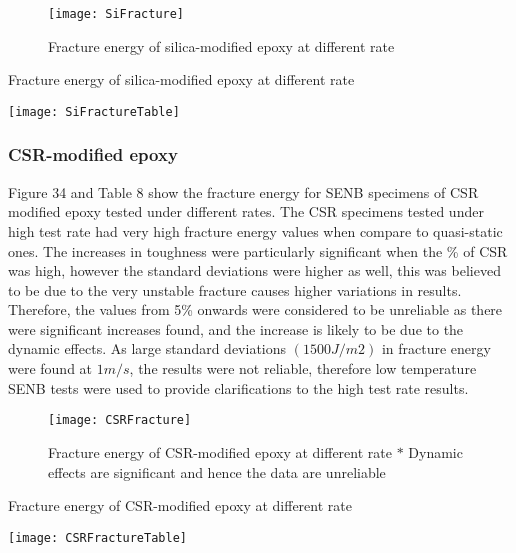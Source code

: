 \documentclass[numbers=noendperiod,chapterprefix=on]{icldt} %
\begin{document}
\begin{figure}[!htpb]
\centering
\texttt{[image: SiFracture]}
\caption{Fracture energy of silica-modified epoxy at different rate} %
\end{figure}
\FloatBarrier

\begin{table}[!htpb]
\centering
\caption{Fracture energy of silica-modified epoxy at different rate} %
\texttt{[image: SiFractureTable]}
\end{table}
\FloatBarrier


\subsubsection{CSR-modified epoxy}
Figure 34 and Table 8 show the fracture energy for SENB specimens of CSR modified epoxy tested under different rates. The CSR specimens tested under high test rate had very high fracture energy values when compare to quasi-static ones. The increases in toughness were particularly significant when the \% of CSR was high, however the standard deviations were higher as well, this was believed to be due to the very unstable fracture causes higher variations in results. Therefore, the values from 5\% onwards were considered to be unreliable as there were significant increases found, and the increase is likely to be due to the dynamic effects. 
As large standard deviations $(1500 J/m2)$ in fracture energy were found at $1 m/s$, the results were not reliable, therefore low temperature SENB tests were used to provide clarifications to the high test rate results.

\begin{figure}[!htpb]
\centering
\texttt{[image: CSRFracture]}
\caption{Fracture energy of CSR-modified epoxy at different rate \newline $\ast$ Dynamic effects are significant and hence the data are unreliable} %
\end{figure}
\FloatBarrier

\begin{table}[!htpb]
\centering
\caption{Fracture energy of CSR-modified epoxy at different rate} %
\texttt{[image: CSRFractureTable]}
\end{table}
\FloatBarrier
\end{document}
